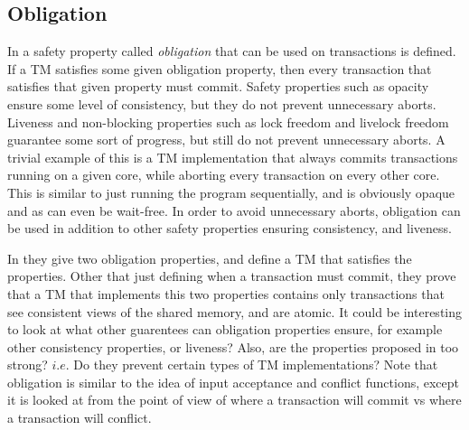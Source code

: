 \subsection{Obligation}
In \cite{1532612} a safety property called \emph{obligation} that can be used on transactions is defined.
If a TM satisfies some given obligation property, then every transaction that satisfies that given property must commit.
Safety properties such as opacity ensure some level of consistency, but they do not prevent unnecessary aborts.
Liveness and non-blocking properties such as lock freedom and livelock freedom guarantee some sort of progress, but still do not prevent unnecessary aborts.
A trivial example of this is a TM implementation that always commits transactions running on a given core, while aborting every transaction on every other core.
This is similar to just running the program sequentially, and is obviously opaque and as can even be wait-free.
In order to avoid unnecessary aborts, obligation can be used in addition to other safety properties ensuring consistency, and liveness.

In \cite{1532612} they give two obligation properties, and define a TM that satisfies the properties.
Other that just defining when a transaction must commit, they prove that a TM that implements this two properties contains only transactions that see consistent views of the shared memory, and are atomic.
It could be interesting to look at what other guarentees can obligation properties ensure, for example other consistency properties, or liveness?
Also, are the properties proposed in \cite{1532612} too strong? $i.e.$ Do they prevent certain types of TM implementations?
Note that obligation is similar to the idea of input acceptance and conflict functions, except it is looked at from the point of view of where a transaction will commit vs where a transaction will conflict.

